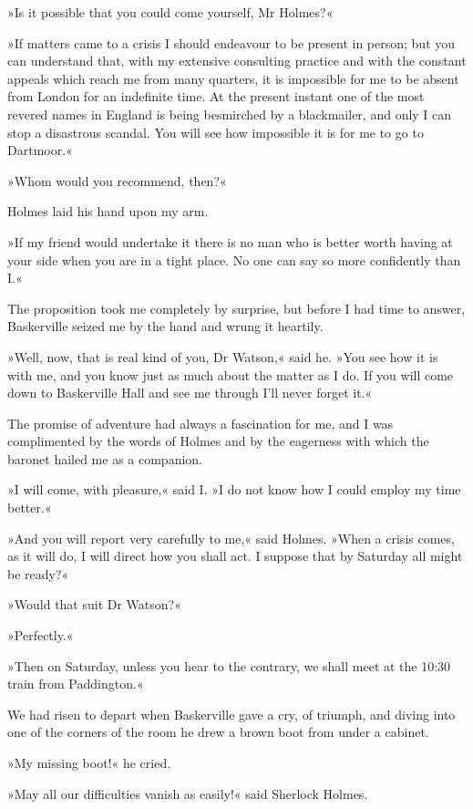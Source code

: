 »Is it possible that you could come yourself, Mr Holmes?«

»If matters came to a crisis I should endeavour to be present in person; but you can understand that, with my extensive consulting practice and with the constant appeals which reach me from many quarters, it is impossible for me to be absent from London for an indefinite time. At the present instant one of the most revered names in England is being besmirched by a blackmailer, and only I can stop a disastrous scandal. You will see how impossible it is for me to go to Dartmoor.«

»Whom would you recommend, then?«

Holmes laid his hand upon my arm.

»If my friend would undertake it there is no man who is better worth having at your side when you are in a tight place. No one can say so more confidently than I.«

The proposition took me completely by surprise, but before I had time to answer, Baskerville seized me by the hand and wrung it heartily.

»Well, now, that is real kind of you, Dr Watson,« said he. »You see how it is with me, and you know just as much about the matter as I do. If you will come down to Baskerville Hall and see me through I'll never forget it.«

The promise of adventure had always a fascination for me, and I was complimented by the words of Holmes and by the eagerness with which the baronet hailed me as a companion.

»I will come, with pleasure,« said I. »I do not know how I could employ my time better.«

»And you will report very carefully to me,« said Holmes. »When a crisis comes, as it will do, I will direct how you shall act. I suppose that by Saturday all might be ready?«

»Would that suit Dr Watson?«

»Perfectly.«

»Then on Saturday, unless you hear to the contrary, we shall meet at the 10:30 train from Paddington.«

We had risen to depart when Baskerville gave a cry, of triumph, and diving into one of the corners of the room he drew a brown boot from under a cabinet.

»My missing boot!« he cried.

»May all our difficulties vanish as easily!« said Sherlock Holmes.

